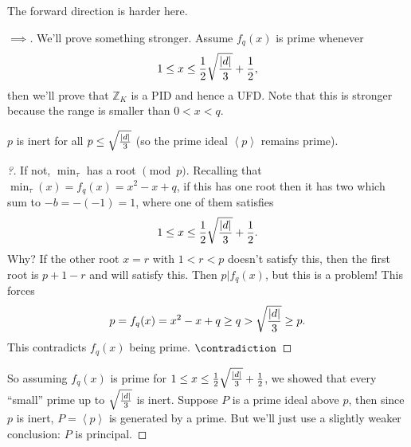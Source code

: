 \begin{remark}

The forward direction is harder here.

\end{remark}

\begin{proof}[$\implies$]

We'll prove something stronger. Assume \(f_q(x)\) is prime whenever
\begin{align*}
1 \leq x \leq {1\over 2} \sqrt{ {\left\lvert {d} \right\rvert} \over 3 } + {1 \over 2}
,\end{align*}
then we'll prove that \({\mathbb{Z}}_K\) is a PID and hence a UFD. Note
that this is stronger because the range is smaller than \(0<x<q\).

\begin{claim}

\(p\) is inert for all
\(p \leq \sqrt{ {\left\lvert {d} \right\rvert}\over 3 }\) (so the prime
ideal \(\left\langle{ p }\right\rangle\) remains prime).

\end{claim}

\begin{proof}[?]

If not, \(\min_\tau\) has a root \(\pmod p\). Recalling that
\(\min_\tau(x) = f_q(x) = x^2 - x + q\), if this has one root then it
has two which sum to \(-b = -(-1) = 1\), where one of them satisfies
\begin{align*}
1 \leq x \leq {1\over 2} \sqrt{ {\left\lvert {d} \right\rvert} \over 3 } + {1\over 2}
.\end{align*}
Why? If the other root \(x = r\) with \(1<r<p\) doesn't satisfy this,
then the first root is \(p+1-r\) and will satisfy this. Then
\(p\mathrel{\Big|}f_q(x)\), but this is a problem! This forces
\begin{align*}
p = f_q(x) = x^2 - x + q \geq q > \sqrt{{\left\lvert {d} \right\rvert} \over 3 } \geq p
.\end{align*}
This contradicts \(f_q(x)\) being prime. \(\contradiction\)

\end{proof}

So assuming \(f_q(x)\) is prime for
\(1 \leq x \leq {1 \over 2 } \sqrt{{\left\lvert {d} \right\rvert}\over 3 } + {1 \over 2}\),
we showed that every ``small'' prime up to
\(\sqrt{{\left\lvert {d} \right\rvert}\over 3 }\) is inert. Suppose
\(P\) is a prime ideal above \(p\), then since \(p\) is inert,
\(P = \left\langle{ p }\right\rangle\) is generated by a prime. But
we'll just use a slightly weaker conclusion: \(P\) is principal.


\end{proof}
